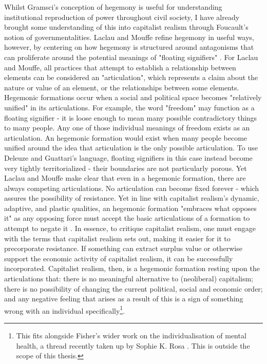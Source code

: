 Whilst Gramsci's conception of hegemony is useful for understanding institutional reproduction of power throughout civil society, I have already brought some understanding of this into capitalist realism through Foucault's notion of governmentalities. Laclau and Mouffe refine hegemony in useful ways, however, by centering on how hegemony is structured around antagonisms that can proliferate around the potential meanings of "floating signifiers" \citep[p. 136]{laclau_hegemony_2001}. For Laclau and Mouffe, all practices that attempt to establish a relationship between elements can be considered an "articulation", which represents a claim about the nature or value of an element, or the relationships between some elements. Hegemonic formations occur when a social and political space becomes "relatively unified" \citeyearpar[p. 136]{laclau_hegemony_2001} in its articulations. For example, the word "freedom" may function as a floating signifier - it is loose enough to mean many possible contradictory things to many people. Any one of those individual meanings of freedom exists as an articulation. An hegemonic formation would exist when many people become unified around the idea that articulation is the only possible articulation. To use Deleuze and Guattari's language, floating signifiers in this case instead become very tightly territorialized - their boundaries are not particularly porous. Yet Laclau and Mouffe make clear that even in a hegemonic formation, there are always competing articulations. No articulation can become fixed forever - which assures  the possibility of resistance. Yet in line with capitalist realism's dynamic, adaptive, and plastic qualities, an hegemonic formation "embraces what opposes it" as any opposing force must accept the basic articulations of a formation to attempt to negate it \citep[p. 139]{laclau_hegemony_2001}. In essence, to critique capitalist realism, one must engage with the terms that capitalist realism sets out, making it easier for it to precorporate resistance.  If something can extract surplus value or otherwise support the economic activity of capitalist realism, it can be successfully incorporated. Capitalist realism, then, is a hegemonic formation resting upon the articulations that: there is no meaningful alternative to (neoliberal) capitalism; there is no possibility of changing the current political, social and economic order; and any negative feeling that arises as a result of this is a sign of something wrong with an individual specifically\footnote{This fits alongside Fisher's wider work on the individualisation of mental health, a thread recently taken up by Sophie K. Rosa \citeyearpar{rosa_radical_2023}. This is outside the scope of this thesis.}. 

